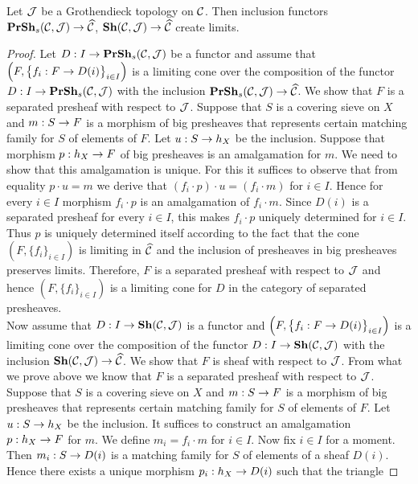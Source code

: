 \begin{theorem}\label{theorem:limitsinsheavesandseparatedpresheaves}
Let ${\mathcal J}$ be a Grothendieck topology on ${\mathcal C}$. Then inclusion functors $\mathbf{PrSh}_s({\mathcal C},{\mathcal J})\rightarrow \widehat{{\mathcal C}}$, $\mathbf{Sh}({\mathcal C},{\mathcal J})\rightarrow \widehat{{\mathcal C}}$ create limits.
\end{theorem}
\begin{proof}
Let $D:I\rightarrow \mathbf{PrSh}_s({\mathcal C},{\mathcal J})$ be a functor and assume that $\left(F,\big\{f_i:F\rightarrow D(i)\big\}_{i\in I}\right)$ is a limiting cone over the composition of the functor $D:I\rightarrow \mathbf{PrSh}_s({\mathcal C},{\mathcal J})$ with the inclusion $\mathbf{PrSh}_s({\mathcal C},{\mathcal J})\rightarrow \widehat{{\mathcal C}}$. We show that $F$ is a separated presheaf with respect to ${\mathcal J}$. Suppose that $S$ is a covering sieve on $X$ and $m:S\rightarrow F$ is a morphism of big presheaves that represents certain matching family for $S$ of elements of $F$. Let $u:S\rightarrow h_X$ be the inclusion. Suppose that morphism $p:h_X\rightarrow F$ of big presheaves is an amalgamation for $m$. We need to show that this amalgamation is unique. For this it suffices to observe that from equality $p\cdot u = m$ we derive that $(f_i\cdot p)\cdot u = (f_i\cdot m)$ for $i\in I$. Hence for every $i\in I$ morphism $f_i\cdot p$ is an amalgamation of $f_i\cdot m$. Since $D(i)$ is a separated presheaf for every $i\in I$, this makes $f_i\cdot p$ uniquely determined for $i\in I$. Thus $p$ is uniquely determined itself according to the fact that the cone $\left(F,\big\{f_i\big\}_{i\in I}\right)$ is limiting in $\widehat{{\mathcal C}}$ and the inclusion of presheaves in big presheaves preserves limits. Therefore, $F$ is a separated presheaf with respect to ${\mathcal J}$ and hence $\left(F,\big\{f_i\big\}_{i\in I}\right)$ is a limiting cone for $D$ in the category of separated presheaves.\\
Now assume that $D:I\rightarrow \mathbf{Sh}({\mathcal C},{\mathcal J})$ is a functor and $\left(F,\big\{f_i:F\rightarrow D(i)\big\}_{i\in I}\right)$ is a limiting cone over the composition of the functor $D:I\rightarrow \mathbf{Sh}({\mathcal C},{\mathcal J})$ with the inclusion $\mathbf{Sh}({\mathcal C},{\mathcal J})\rightarrow \widehat{{\mathcal C}}$. We show that $F$ is sheaf with respect to ${\mathcal J}$. From what we prove above we know that $F$ is a separated presheaf with respect to ${\mathcal J}$. Suppose that $S$ is a covering sieve on $X$ and $m:S\rightarrow F$ is a morphism of big presheaves that represents certain matching family for $S$ of elements of $F$. Let $u:S\rightarrow h_X$ be the inclusion. It suffices to construct an amalgamation $p:h_X\rightarrow F$ for $m$. We define $m_i = f_i \cdot m$ for $i\in I$. Now fix $i\in I$ for a moment. Then $m_i:S\rightarrow D(i)$ is a matching family for $S$ of elements of a sheaf $D(i)$. Hence there exists a unique morphism $p_i:h_X\rightarrow D(i)$ such that the triangle

\end{proof}
